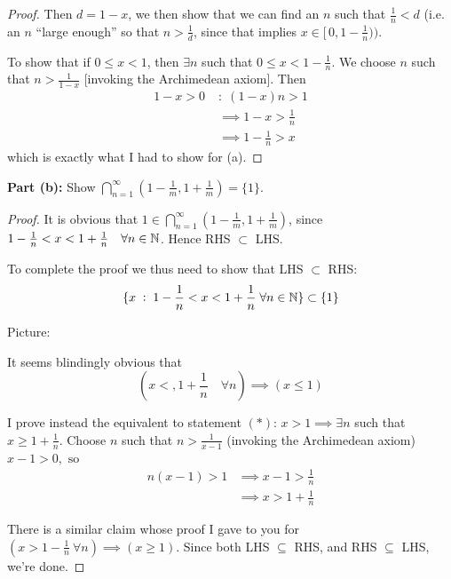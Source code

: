 \documentclass[10pt]{scrartcl}
\begin{document}
\begin{example}
\begin{proof}
Then $d = 1-x$, we then show that we can find an $n$ such that $\frac{1}{n} < d$ (i.e. an $n$ ``large enough'' so that $ n > \frac{1}{d}$, since that implies $ x \in [\,0, 1- \frac{1}{n}) )$. 

To show that if $0 \leq x < 1 $, then $\exists n$ such that $0 \leq x < 1 - \frac{1}{n}$. We choose $n$ such that $ n > \frac{1}{1 - x}$ [invoking the Archimedean axiom]. Then 
\[\begin{aligned}
1-x>0 \; &: \; (1-x)n > 1\\
 &\implies 1-x > \frac{1}{n}\\
 &\implies1- \frac{1}{n} > x
\end{aligned}\]
which is exactly what I had to show for (a). 
\end{proof}


\textbf{Part (b):} Show ${\bigcap_{n=1}^{\infty} (1-\frac{1}{m}, 1+ \frac{1}{m}) = \{1\}}$.

\begin{proof}

It is obvious that $1 \in \bigcap_{n=1}^{\infty} (1-\frac{1}{m}, 1 + \frac{1}{m})$, since $1- \frac{1}{n} < x < 1 + \frac{1}{n} \quad \forall n \in \mathbb{N}$. Hence RHS $\subset$ LHS. 

To complete the proof we thus need to show  that LHS $\subset$ RHS: \[\{x \; : \; 1 - \frac{1}{n} < x < 1 + \frac{1}{n} \; \forall n \in \mathbb{N}\} \subset \{1\}\]

Picture:\\
\begin{center}
\vspace*{5pt}
\end{center}

It seems blindingly obvious that \[(x < ,1 + \frac{1}{n} \quad \forall n) \implies (x \leq 1) \tag{$*$}\]

I prove instead the equivalent to statement $(*)$: $x> 1 \implies \exists n $ such that $ x \geq 1 + \frac{1}{n}$. Choose $n$ such that $n > \frac{1}{x-1}$ (invoking the Archimedean axiom) 
$x-1 > 0, \text{ so }$
\[\begin{aligned} n(x-1) > 1 &\implies \textstyle{x-1 > \frac{1}{n} }\\ &\implies \textstyle{x > 1 + \frac{1}{n} } \end{aligned}\]

There is a similar claim whose proof I gave to you for $(x > 1 - \frac{1}{n}~ \forall n) \implies (x \geq 1)$. Since both LHS $\subseteq$ RHS, and RHS $\subseteq$ LHS, we're done.
\end{proof}
\end{example}\vsp
\end{document}
